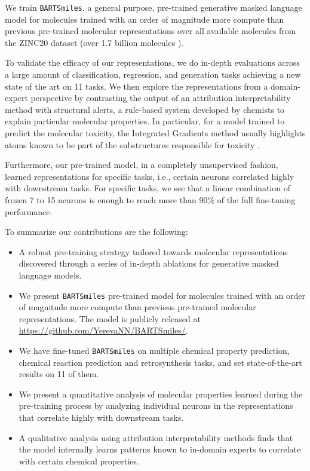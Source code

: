 \documentclass{article} %
\newcommand{\MODEL}{\texttt{BARTSmiles}}
\begin{document}
We train \MODEL{}, a general purpose, pre-trained generative masked language model for molecules trained with an order of magnitude more compute than previous pre-trained molecular representations over all available molecules from the ZINC20 dataset (over 1.7 billion molecules \citep{ZINC20}).

To validate the efficacy of our representations, we do in-depth evaluations across a large amount of classification, regression, and generation tasks achieving a new state of the art on 11 tasks. We then explore the representations from a domain-expert perspective by contrasting the output of an attribution interpretability method with structural alerts, a rule-based system developed by chemists to explain particular molecular properties. In particular, for a model trained to predict the molecular toxicity, the Integrated Gradients method usually highlights atoms known to be part of the substructures responsible for toxicity \citep{integrated-gradients}.

Furthermore, our pre-trained model, in a completely unsupervised fashion, learned representations for specific tasks, i.e., certain neurons correlated highly with downstream tasks. For specific tasks, we see that a linear combination of frozen 7 to 15 neurons is enough to reach more than 90\% of the full fine-tuning performance.



To summarize our contributions are the following:
\begin{itemize}
    \item A robust pre-training strategy tailored towards molecular representations discovered through a series of in-depth ablations for generative masked language models.
    \item We present \MODEL{} pre-trained model for molecules trained with an order of magnitude more compute than previous pre-trained molecular representations. The model is publicly released at \url{https://github.com/YerevaNN/BARTSmiles/}.
    \item We have fine-tuned \MODEL{} on multiple chemical property prediction, chemical reaction prediction and retrosynthesis tasks, and set state-of-the-art results on 11 of them.
    \item We present a quantitative analysis of molecular properties learned during the pre-training process by analyzing individual neurons in the representations that correlate highly with downstream tasks. 
    \item A qualitative analysis using attribution interpretability methods finds that the model internally learns patterns known to in-domain experts to correlate with certain chemical properties.
\end{itemize}
\end{document}
